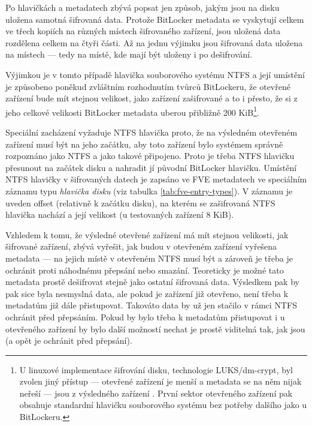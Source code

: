 
\label{sec:data-map}

Po hlavičkách a metadatech zbývá popsat jen způsob, jakým jsou na disku uložena samotná šifrovaná data. Protože BitLocker metadata se vyskytují celkem ve třech kopiích na různých místech  šifrovaného zařízení, jsou uložená data rozdělena celkem na čtyři části. Až na jednu výjimku jsou šifrovaná data uložena na  místech --- tedy na místě, kde mají být uloženy i po dešifrování.

Výjimkou je v tomto případě hlavička souborového systému NTFS a její  umístění je způsobeno poněkud zvláštním rozhodnutím tvůrců BitLockeru, že otevřené zařízení bude mít stejnou velikost, jako zařízení zašifrované a to i přesto, že si z jeho celkové velikosti BitLocker metadata uberou přibližně 200 KiB\footnote{U linuxové implementace šifrování disku, technologie LUKS/dm-crypt, byl zvolen jiný přístup --- otevřené zařízení je menší a metadata se na něm nijak neřeší --- jsou z výsledného zařízení . První sektor otevřeného zařízení pak obsahuje standardní hlavičku souborového systému bez potřeby dalšího  jako u BitLockeru.}.


Speciální zacházení vyžaduje NTFS hlavička proto, že na výsledném otevřeném zařízení musí být na jeho začátku, aby toto zařízení bylo systémem správně rozpoznáno jako NTFS a jako takové připojeno. Proto je třeba NTFS hlavičku přesunout na začátek disku a nahradit jí původní BitLocker hlavičku. Umístění NTFS hlavičky v šifrovaných datech je zapsáno ve FVE metadatech ve speciálním záznamu typu \emph{hlavička disku} (viz tabulka \ref{tab:fve-entry-types}). V záznamu je uveden offset (relativně k začátku disku), na kterém se zašifrovaná NTFS hlavička nachází a její velikost (u testovaných zařízení 8 KiB).

Vzhledem k tomu, že výsledné otevřené zařízení má mít stejnou velikosti, jak šifrované zařízení, zbývá vyřešit, jak budou v otevřeném zařízení vyřešena metadata --- na jejich místě v otevřeném NTFS musí  být a zároveň je třeba je ochránit proti náhodnému přepsání nebo smazání. Teoreticky je možné tato metadata prostě dešifrovat stejně jako ostatní šifrovaná data. Výsledkem pak by pak sice byla nesmyslná data, ale pokud je zařízení již otevřeno, není třeba k metadatům již dále přistupovat. Takováto  data by už jen stačilo v rámci NTFS ochránit před přepsáním. Pokud by bylo třeba k metadatům přistupovat i u otevřeného zařízení by bylo další možností nechat je prostě viditelná tak, jak jsou (a opět je ochránit před přepsání).

